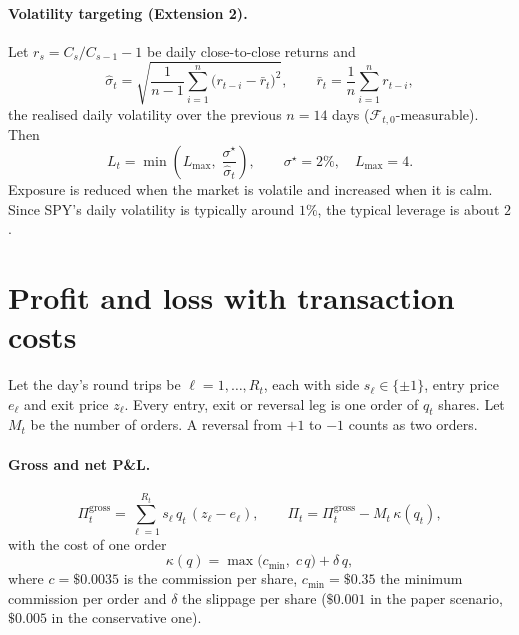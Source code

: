 \documentclass[11pt,a4paper]{article}
\newcommand{\1}{\mathbf{1}}
\begin{document}
\paragraph{Volatility targeting (Extension 2).} Let $r_s = C_s / C_{s-1} - 1$ be daily close-to-close returns and
\begin{equation}
  \hat\sigma_t = \sqrt{\frac{1}{n-1}\sum_{i=1}^{n}\big(r_{t-i} - \bar r_t\big)^2}, \qquad
  \bar r_t = \frac1n\sum_{i=1}^n r_{t-i},
\end{equation}
the realised daily volatility over the previous $n=14$ days ($\mathcal F_{t,0}$-measurable). Then
\begin{equation}\label{eq:lev}
  L_t = \min\!\left(L_{\max},\; \frac{\sigma^\star}{\hat\sigma_t}\right),
  \qquad \sigma^\star = 2\%,\quad L_{\max} = 4 .
\end{equation}
Exposure is reduced when the market is volatile and increased when it is calm. Since SPY's daily volatility
is typically around $1\%$, the typical leverage is about $2$.

\section{Profit and loss with transaction costs}

Let the day's round trips be $\ell = 1,\dots,R_t$, each with side $s_\ell\in\{\pm1\}$,
entry price $e_\ell$ and exit price $z_\ell$. Every entry, exit or reversal leg is one order of $q_t$
shares. Let $M_t$ be the number of orders. A reversal from $+1$ to $-1$ counts as two orders.

\paragraph{Gross and net P\&L.}
\begin{equation}
  \Pi^{\text{gross}}_t = \sum_{\ell=1}^{R_t} s_\ell\, q_t\,(z_\ell - e_\ell),
  \qquad
  \Pi_t = \Pi^{\text{gross}}_t - M_t\,\kappa(q_t),
\end{equation}
with the cost of one order
\begin{equation}
  \kappa(q) = \max\big(c_{\min},\; c\,q\big) + \delta\, q ,
\end{equation}
where $c = \$0.0035$ is the commission per share, $c_{\min} = \$0.35$ the minimum commission per order and
$\delta$ the slippage per share ($\$0.001$ in the paper scenario, $\$0.005$ in the conservative one).
\end{document}
